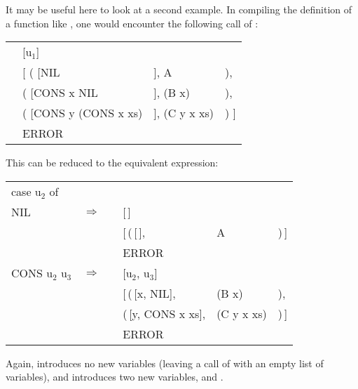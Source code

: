 It may be useful here to look at a second example. In compiling the definition of a function like , one would encounter the following call of :
\begin{mlcoded}
    \setlength{\tabcolsep}{0.25em}
    \begin{tabular}{llll}
        \metafn{match} &[u$_1$]  && \\
        &[ ( [NIL&], A &), \\
        &\phantom{[ }( [CONS x NIL&], (B x) &), \\
        &\phantom{[ }( [CONS y (CONS x xs)&], (C y x xs) &) ] \\
        &ERROR
    \end{tabular}
\end{mlcoded}
This can be reduced to the equivalent expression:
\begin{mlcoded}
    \setlength{\tabcolsep}{0.25em}
    \begin{tabular}{llllll}
        case u$_2$ of &&&&& \\
        \quad NIL &$\Rightarrow$ &\metafn{match} &[\,] && \\
        &&&[\,(\,[\,], &A &)\,] \\
        &&&ERROR &&\\
        \quad CONS\! u$_2$\! u$_3$ &$\Rightarrow$ &\metafn{match} &[u$_2$, u$_3$] &&\\
        &&&[\,(\,[x, NIL], &(B x) &), \\
        &&&\phantom{[\,}(\,[y, CONS x xs], &(C y x xs) &)\,] \\
        &&&ERROR
    \end{tabular}
\end{mlcoded}
Again,  introduces no new variables (leaving a call of  with an empty list of variables), and  introduces two new variables,  and .

